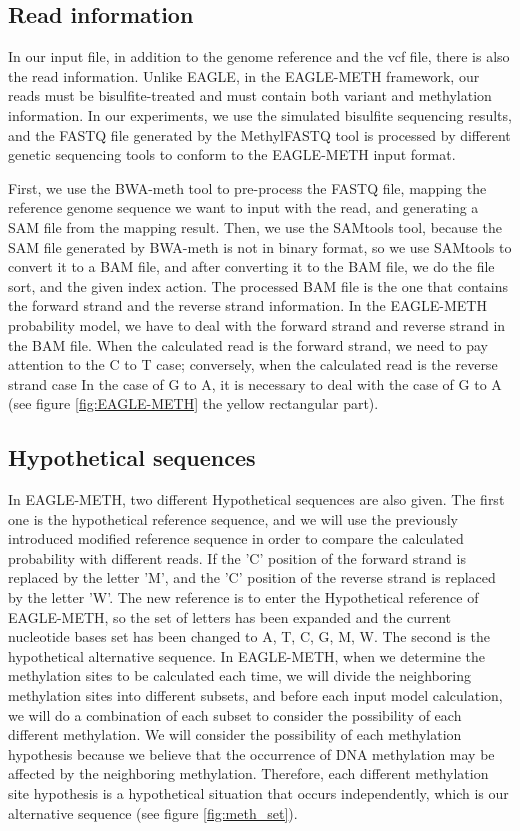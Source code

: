 \documentclass{PHlab-thesis}
\begin{document}
\subsection{Read information}
In our input file, in addition to the genome reference and the vcf file, there is also the read information. Unlike EAGLE, in the EAGLE-METH framework, our reads must be bisulfite-treated and must contain both variant and methylation information. In our experiments, we use the simulated bisulfite sequencing results, and the FASTQ file generated by the MethylFASTQ tool is processed by different genetic sequencing tools to conform to the EAGLE-METH input format.
\par First, we use the BWA-meth tool to pre-process the FASTQ file, mapping the reference genome sequence we want to input with the read, and generating a SAM file from the mapping result. Then, we use the SAMtools tool, because the SAM file generated by BWA-meth is not in binary format, so we use SAMtools to convert it to a BAM file, and after converting it to the BAM file, we do the file sort, and the given index action. The processed BAM file is the one that contains the forward strand and the reverse strand information. In the EAGLE-METH probability model, we have to deal with the forward strand and reverse strand in the BAM file. When the calculated read is the forward strand, we need to pay attention to the C to T case; conversely, when the calculated read is the reverse strand case In the case of G to A, it is necessary to deal with the case of G to A (see figure \ref{fig:EAGLE-METH} the yellow rectangular part).
\subsection{Hypothetical sequences}
In EAGLE-METH, two different Hypothetical sequences are also given.
The first one is the hypothetical reference sequence, and we will use the previously introduced modified reference sequence in order to compare the calculated probability with different reads. If the 'C' position of the forward strand is replaced by the letter 'M', and the 'C' position of the reverse strand is replaced by the letter 'W'. The new reference is to enter the Hypothetical reference of EAGLE-METH, so the set of letters has been expanded and the current nucleotide bases set has been changed to A, T, C, G, M, W. The second is the hypothetical alternative sequence. In EAGLE-METH, when we determine the methylation sites to be calculated each time, we will divide the neighboring methylation sites into different subsets, and before each input model calculation, we will do a combination of each subset to consider the possibility of each different methylation. We will consider the possibility of each methylation hypothesis because we believe that the occurrence of DNA methylation may be affected by the neighboring methylation. Therefore, each different methylation site hypothesis is a hypothetical situation that occurs independently, which is our alternative sequence (see figure \ref{fig:meth_set}).
\end{document}
